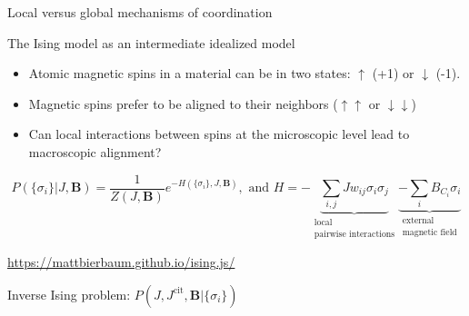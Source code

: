\documentclass[10pt]{beamer}
\begin{document}
\begin{frame}{Local versus global mechanisms of coordination}
\begin{figure}
\end{figure}
\end{frame}


\begin{frame}{The Ising model as an intermediate idealized model}    
    \begin{itemize}
        \item Atomic magnetic spins in a material can be in two states: $\uparrow$ (+1) or $\downarrow$ (-1).
        \item Magnetic spins prefer to be aligned to their neighbors ($\uparrow\uparrow$ or $\downarrow\downarrow$)
        \item Can local interactions between spins at the microscopic level lead to macroscopic alignment?
    \end{itemize}

    \begin{equation}
    \label{eq:ising}
    P(\{\sigma_i\}|J,\bm{B}) = \frac{1}{Z(J,\bm{B})} e^{-H(\{\sigma_i\},J,\bm{B})}, \text{ and } H = -\underbrace{\sum_{i,j} J w_{ij} \sigma_{i}\sigma_j}_{\substack{\text{local}\\\text{pairwise interactions}}}\underbrace{- \sum_i B_{C_i}\sigma_i}_{\substack{\text{external}\\\text{magnetic field}}}
\end{equation}

\vspace{1em}

\centering
\url{https://mattbierbaum.github.io/ising.js/}

\centering
\vspace{1em}
Inverse Ising problem: $P(J,J^\text{cit},\bm{B}|\{\sigma_i\})$
\end{frame}
\end{document}
